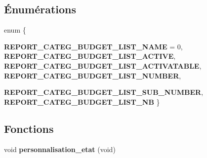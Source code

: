 \subsection*{Énumérations}
\begin{DoxyCompactItemize}
\item 
enum \{ \par
{\bf REPORT\_\-CATEG\_\-BUDGET\_\-LIST\_\-NAME} =  0, 
{\bf REPORT\_\-CATEG\_\-BUDGET\_\-LIST\_\-ACTIVE}, 
{\bf REPORT\_\-CATEG\_\-BUDGET\_\-LIST\_\-ACTIVATABLE}, 
{\bf REPORT\_\-CATEG\_\-BUDGET\_\-LIST\_\-NUMBER}, 
\par
{\bf REPORT\_\-CATEG\_\-BUDGET\_\-LIST\_\-SUB\_\-NUMBER}, 
{\bf REPORT\_\-CATEG\_\-BUDGET\_\-LIST\_\-NB}
 \}
\end{DoxyCompactItemize}
\subsection*{Fonctions}
\begin{DoxyCompactItemize}
\item 
void {\bf personnalisation\_\-etat} (void)
\end{DoxyCompactItemize}
